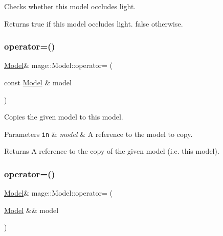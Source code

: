 Checks whether this model occludes light.

\begin{DoxyReturn}{Returns}
{\ttfamily true} if this model occludes light. {\ttfamily false} otherwise. 
\end{DoxyReturn}
\hypertarget{classmage_1_1_model_a563515c64ec39cfcda9f6ca37576391b}{}\label{classmage_1_1_model_a563515c64ec39cfcda9f6ca37576391b} 
\subsubsection{\texorpdfstring{operator=()}{operator=()}\hspace{0.1cm}{\footnotesize\ttfamily [1/2]}}
{\footnotesize\ttfamily \hyperlink{classmage_1_1_model}{Model}\& mage\+::\+Model\+::operator= (\begin{DoxyParamCaption}\item[{const \hyperlink{classmage_1_1_model}{Model} \&}]{model }\end{DoxyParamCaption})\hspace{0.3cm}{\ttfamily [delete]}}

Copies the given model to this model.


\begin{DoxyParams}[1]{Parameters}
\mbox{\tt in}  & {\em model} & A reference to the model to copy. \\
\hline
\end{DoxyParams}
\begin{DoxyReturn}{Returns}
A reference to the copy of the given model (i.\+e. this model). 
\end{DoxyReturn}
\hypertarget{classmage_1_1_model_a084e30d15822bfefa79128f30a57cc02}{}\label{classmage_1_1_model_a084e30d15822bfefa79128f30a57cc02} 
\subsubsection{\texorpdfstring{operator=()}{operator=()}\hspace{0.1cm}{\footnotesize\ttfamily [2/2]}}
{\footnotesize\ttfamily \hyperlink{classmage_1_1_model}{Model}\& mage\+::\+Model\+::operator= (\begin{DoxyParamCaption}\item[{\hyperlink{classmage_1_1_model}{Model} \&\&}]{model }\end{DoxyParamCaption})\hspace{0.3cm}{\ttfamily [delete]}}

